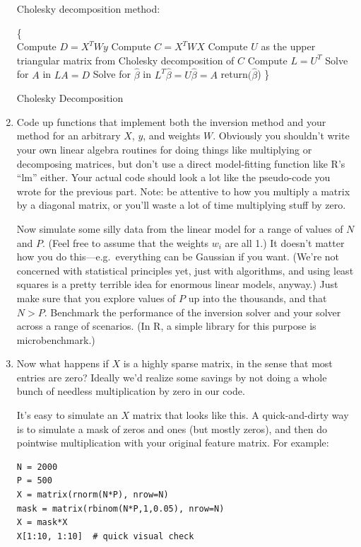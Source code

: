 \documentclass{article}
\begin{document}
\begin{enumerate}[label=(\Alph*)]
{		Cholesky decomposition method:
			\begin{algorithm}[htp!]
			 \{ \\
			 \vspace{2mm}
			 Compute $D = X^T W y$ \; 
			 Compute $C = X^T W X$\; 
			 \vspace{2mm}
			 Compute $U$ as the upper triangular matrix from Cholesky decomposition of $C$\;
			 Compute $L = U^T$\; 
			 \vspace{2mm}
			 Solve for $A$ in $LA=D$\;
			 Solve for $\hat{\beta}$ in $L^T\hat{\beta}=U\hat{\beta}=A$\;
			 \vspace{2mm}
			 return$(\hat{\beta}$)\; 
			 \}
			 \caption{Cholesky Decomposition}
			\end{algorithm}


}

\clearpage
\item Code up functions that implement both the inversion method and your method for an arbitrary $X$, $y$, and weights $W$.  Obviously you shouldn't write your own linear algebra routines for doing things like multiplying or decomposing matrices, but don't use a direct model-fitting function like R's ``lm'' either.   Your actual code should look a lot like the pseudo-code you wrote for the previous part.  Note: be attentive to how you multiply a matrix by a diagonal matrix, or you'll waste a lot of time multiplying stuff by zero.

Now simulate some silly data from the linear model for a range of values of $N$ and $P$.  (Feel free to assume that the weights $w_i$ are all 1.)  It doesn't matter how you do this---e.g.~everything can be Gaussian if you want.  (We're not concerned with statistical principles yet, just with algorithms, and using least squares is a pretty terrible idea for enormous linear models, anyway.)  Just make sure that you explore values of $P$ up into the thousands, and that $N > P$.  Benchmark the performance of the inversion solver and your solver across a range of scenarios.  (In R, a simple library for this purpose is microbenchmark.)

\item Now what happens if $X$ is a highly sparse matrix, in the sense that most entries are zero?  Ideally we'd realize some savings by not doing a whole bunch of needless multiplication by zero in our code.

It's easy to simulate an $X$ matrix that looks like this.  A quick-and-dirty way is to simulate a mask of zeros and ones (but mostly zeros), and then do pointwise multiplication with your original feature matrix.  For example:
\begin{verbatim}
N = 2000
P = 500
X = matrix(rnorm(N*P), nrow=N)
mask = matrix(rbinom(N*P,1,0.05), nrow=N)
X = mask*X
X[1:10, 1:10]  # quick visual check
\end{verbatim}


\end{enumerate}
\end{document}
